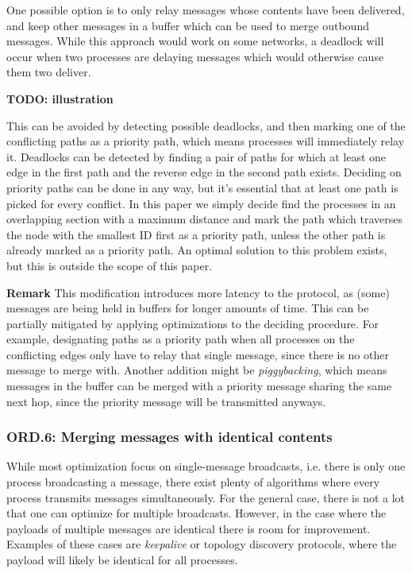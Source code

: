 One possible option is to only relay messages whose contents have been delivered, and keep other messages in a buffer which can be used to merge outbound messages. While this approach would work on some networks, a deadlock will occur when two processes are delaying messages which would otherwise cause them two deliver.

\textbf{TODO: illustration}

This can be avoided by detecting possible deadlocks, and then marking one of the conflicting paths as a priority path, which means processes will immediately relay it. Deadlocks can be detected by finding a pair of paths for which at least one edge in the first path and the reverse edge in the second path exists. Deciding on priority paths can be done in any way, but it's essential that at least one path is picked for every conflict. In this paper we simply decide find the processes in an overlapping section with a maximum distance and mark the path which traverses the node with the smallest ID first as a priority path, unless the other path is already marked as a priority path. An optimal solution to this problem exists, but this is outside the scope of this paper.

\textbf{Remark}
This modification introduces more latency to the protocol, 
as (some) messages are being held in buffers for longer amounts of time. This can be partially mitigated by applying optimizations to the deciding procedure. For example, designating paths as a priority path when all processes on the conflicting edges only have to relay that single message, since there is no other message to merge with. Another addition might be \textit{piggybacking}, which means messages in the buffer can be merged with a priority message sharing the same next hop, since the priority message will be transmitted anyways.



\subsubsection{ORD.6: Merging messages with identical contents}
While most optimization focus on single-message broadcasts, i.e. there is only one process broadcasting a message, there exist plenty of algorithms where every process transmits messages simultaneously. For the general case, there is not a lot that one can optimize for multiple broadcasts. However, in the case where the payloads of multiple messages are identical there is room for improvement. Examples of these cases are \textit{keepalive} or topology discovery protocols, where the payload will likely be identical for all processes. 


